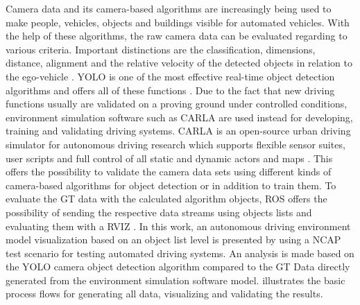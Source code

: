 Camera data and its camera-based algorithms are increasingly being used to make people, vehicles, objects and buildings visible for automated vehicles. With the help of these algorithms, the raw camera data can be evaluated regarding to various criteria. Important distinctions are the classification, dimensions, distance, alignment and the relative velocity of the detected objects in relation to the ego-vehicle \cite{Aeberhard}. \ac{YOLO} is one of the most effective real-time object detection algorithms and offers all of these functions \cite{knuthwebsite}.
Due to the fact that new driving functions usually are validated on a proving ground under controlled conditions, environment simulation software such as CARLA are used instead for developing, training and validating driving systems\cite{Gap}. CARLA is an open-source urban driving simulator for autonomous driving research which supports flexible sensor suites, user scripts and full control of all static and dynamic actors and maps \cite{Dosovitskiy17}. This offers the possibility to validate the camera data sets using different kinds of camera-based algorithms for object detection or in addition to train them. To evaluate the \ac{GT} data with the calculated algorithm objects, \ac{ROS} offers the possibility of sending the respective data streams using objects lists and evaluating them with a \ac{RVIZ} \cite{ROS}.
In this work, an autonomous driving environment model visualization based on an object list level is presented by using a NCAP test scenario for testing automated driving systems. An analysis is made based on the \ac{YOLO} camera object detection algorithm compared to the \ac{GT} Data directly generated from the environment simulation software model.  illustrates the basic process flows for generating all data, visualizing and validating the results.
